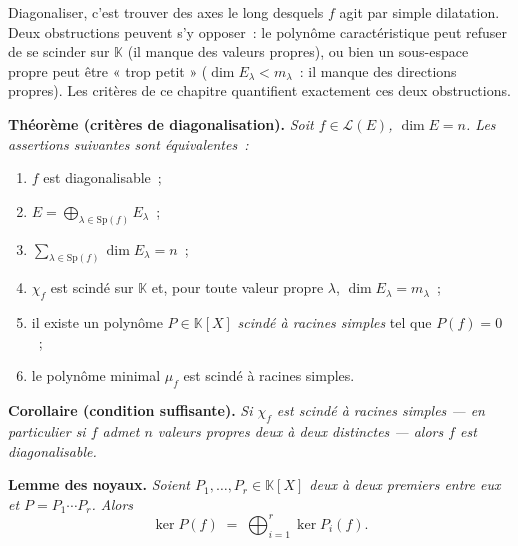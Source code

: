 \begin{significationintuitive}
Diagonaliser, c'est trouver des axes le long desquels $f$ agit par simple
dilatation. Deux obstructions peuvent s'y opposer~: le polynôme
caractéristique peut refuser de se scinder sur $\mathbb{K}$ (il manque des
valeurs propres), ou bien un sous-espace propre peut être « trop petit »
($\dim E_\lambda < m_\lambda$~: il manque des directions propres). Les
critères de ce chapitre quantifient exactement ces deux obstructions.
\end{significationintuitive}

\decsep{}


\begin{tcolorbox}[thmbox]
  \textbf{Théorème (critères de diagonalisation).}\enspace%
  \textit{Soit $f \in \mathcal{L}(E)$, $\dim E = n$. Les assertions
  suivantes sont équivalentes~:}
  \begin{enumerate}
    \item $f$ est diagonalisable~;
    \item $E = \displaystyle\bigoplus_{\lambda \in \mathrm{Sp}(f)} E_\lambda$~;
    \item $\displaystyle\sum_{\lambda \in \mathrm{Sp}(f)} \dim E_\lambda = n$~;
    \item $\chi_f$ est scindé sur $\mathbb{K}$ et, pour toute valeur propre
          $\lambda$, $\dim E_\lambda = m_\lambda$~;
    \item il existe un polynôme $P \in \mathbb{K}[X]$ \emph{scindé à racines
          simples} tel que $P(f) = 0$~;
    \item le polynôme minimal $\mu_f$ est scindé à racines simples.
  \end{enumerate}

  \medskip
  \textbf{Corollaire (condition suffisante).}\enspace%
  \textit{Si $\chi_f$ est scindé à racines simples — en particulier si $f$
  admet $n$ valeurs propres deux à deux distinctes — alors $f$ est
  diagonalisable.}
\end{tcolorbox}


\begin{tcolorbox}[thmbox]
  \textbf{Lemme des noyaux.}\enspace%
  \textit{Soient $P_1, \ldots, P_r \in \mathbb{K}[X]$ deux à deux premiers
  entre eux et $P = P_1 \cdots P_r$. Alors}
  \[
    \ker P(f) \;=\; \bigoplus_{i=1}^{r} \ker P_i(f).
  \]
\end{tcolorbox}

